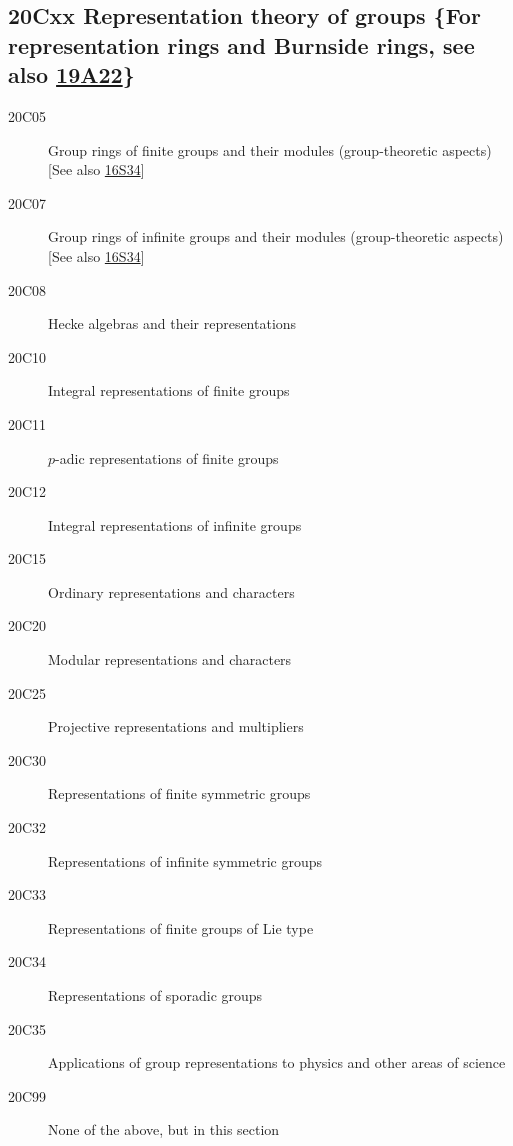 \documentclass[letterpaper]{article}
\begin{document}
\subsection*{20Cxx  Representation theory of groups \{For representation rings and Burnside rings, see also \hyperref[19A22]{19A22}\} }\label{20Cxx}
\begin{description}  
\item [20C05]\label{20C05} Group rings of finite groups and their modules (group-theoretic aspects) [See also \hyperref[16S34]{16S34}]
\item [20C07]\label{20C07} Group rings of infinite groups and their modules (group-theoretic aspects) [See also \hyperref[16S34]{16S34}]
\item [20C08]\label{20C08} Hecke algebras and their representations
\item [20C10]\label{20C10} Integral representations of finite groups
\item [20C11]\label{20C11} $p$-adic representations of finite groups
\item [20C12]\label{20C12} Integral representations of infinite groups
\item [20C15]\label{20C15} Ordinary representations and characters
\item [20C20]\label{20C20} Modular representations and characters
\item [20C25]\label{20C25} Projective representations and multipliers
\item [20C30]\label{20C30} Representations of finite symmetric groups
\item [20C32]\label{20C32} Representations of infinite symmetric groups
\item [20C33]\label{20C33} Representations of finite groups of Lie type
\item [20C34]\label{20C34} Representations of sporadic groups
\item [20C35]\label{20C35} Applications of group representations to physics and other areas of science
\item [20C99]\label{20C99} None of the above, but in this section
\end{description}
\end{document}
